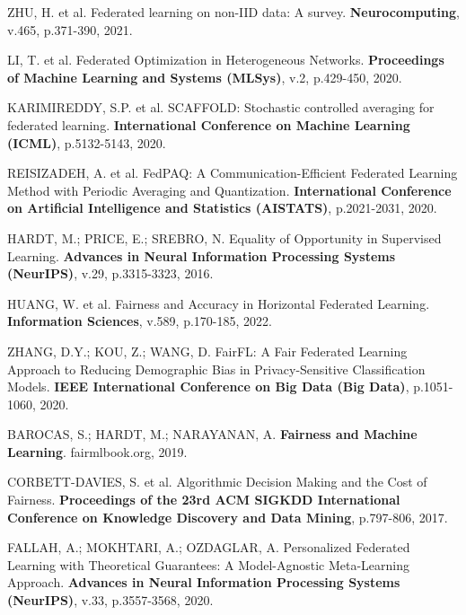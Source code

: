 
ZHU, H. et al.
Federated learning on non-IID data: A survey.
{\bf Neurocomputing},
v.465, p.371-390, 2021.

LI, T. et al.
Federated Optimization in Heterogeneous Networks.
{\bf Proceedings of Machine Learning and Systems (MLSys)},
v.2, p.429-450, 2020.

KARIMIREDDY, S.P. et al.
SCAFFOLD: Stochastic controlled averaging for federated learning.
{\bf International Conference on Machine Learning (ICML)},
p.5132-5143, 2020.

REISIZADEH, A. et al.
FedPAQ: A Communication-Efficient Federated Learning Method with Periodic Averaging and Quantization.
{\bf International Conference on Artificial Intelligence and Statistics (AISTATS)},
p.2021-2031, 2020.


HARDT, M.; PRICE, E.; SREBRO, N.
Equality of Opportunity in Supervised Learning.
{\bf Advances in Neural Information Processing Systems (NeurIPS)},
v.29, p.3315-3323, 2016.

HUANG, W. et al.
Fairness and Accuracy in Horizontal Federated Learning.
{\bf Information Sciences},
v.589, p.170-185, 2022.

ZHANG, D.Y.; KOU, Z.; WANG, D.
FairFL: A Fair Federated Learning Approach to Reducing Demographic Bias in Privacy-Sensitive Classification Models.
{\bf IEEE International Conference on Big Data (Big Data)},
p.1051-1060, 2020.

BAROCAS, S.; HARDT, M.; NARAYANAN, A.
{\bf Fairness and Machine Learning}.
fairmlbook.org, 2019.

CORBETT-DAVIES, S. et al.
Algorithmic Decision Making and the Cost of Fairness.
{\bf Proceedings of the 23rd ACM SIGKDD International Conference on Knowledge Discovery and Data Mining},
p.797-806, 2017.


FALLAH, A.; MOKHTARI, A.; OZDAGLAR, A.
Personalized Federated Learning with Theoretical Guarantees: A Model-Agnostic Meta-Learning Approach.
{\bf Advances in Neural Information Processing Systems (NeurIPS)},
v.33, p.3557-3568, 2020.

